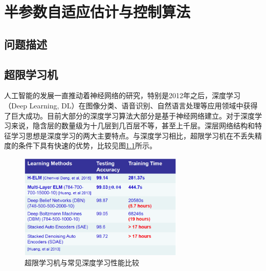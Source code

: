 \chapter{半参数自适应估计与控制算法}
\label{chap:3}

\section{问题描述}

\section{超限学习机}

人工智能的发展一直推动着神经网络的研究，特别是2012年之后，深度学习（Deep Learning, DL）在图像分类、语音识别、自然语言处理等应用领域中获得了巨大成功。目前大部分的深度学习算法大部分是基于神经网络建立。对于深度学习来说，隐含层的数量级为十几层到几百层不等，甚至上千层。深层网络结构和特征学习思想是深度学习的两大主要特点。与深度学习相比，超限学习机在不丢失精度的条件下具有快速的优势，比较见图\ref{fig:elm-dl}所示。

\begin{figure}
 \centering
 \includegraphics[width=0.7\textwidth]{figures/elm-dl}
 \caption{超限学习机与常见深度学习性能比较}\label{fig:elm-dl}
\end{figure}
